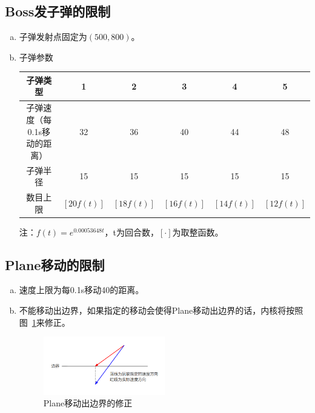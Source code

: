 \documentclass[11pt,a4paper]{article}
\begin{document}
\subsection{Boss发子弹的限制}
\begin{enumerate}[(a)]
\item 子弹发射点固定为$(500,800)$。
\item 子弹参数
\begin{center}
\begin{tabular}{|c|c|c|c|c|c|}
\hline
子弹类型&1&2&3&4&5\\
\hline
子弹速度（每0.1s移动的距离）&32&36&40&44&48\\
\hline
子弹半径&15&15&15&15&15\\
\hline
数目上限&$[20f(t)]$&$[18f(t)]$&$[16f(t)]$&$[14f(t)]$&$[12f(t)]$\\
\hline
\end{tabular}
\end{center}

注：$f(t)=e^{0.00053648t}$，t为回合数，$[\cdot]$为取整函数。
\end{enumerate}
\subsection{Plane移动的限制}
\begin{enumerate}[(a)]
\item 速度上限为每0.1s移动40的距离。
\item 不能移动出边界，如果指定的移动会使得Plane移动出边界的话，内核将按照图~\ref{fig:side}来修正。
\begin{figure}[h!]
\centering
\includegraphics[width=0.5\textwidth]{side.png}
\caption{Plane移动出边界的修正}
\label{fig:side}
\end{figure}
\end{enumerate}
\end{document}
